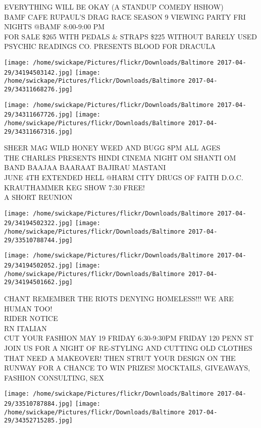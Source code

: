 \documentclass[10pt,letterpaper]{article}
\begin{document}
EVERYTHING WILL BE OKAY (A STANDUP COMEDY HSHOW)\\
BAMF CAFE RUPAUL'S DRAG RACE SEASON 9 VIEWING PARTY FRI NIGHTS @BAMF 8:00{-}9:00 PM\\
FOR SALE \$265 WITH PEDALS \& STRAPS \$225 WITHOUT BARELY USED\\
PSYCHIC READINGS CO. PRESENTS BLOOD FOR DRACULA
\pagebreak

\texttt{[image: /home/swickape/Pictures/flickr/Downloads/Baltimore 2017-04-29/34194503142.jpg]}
\texttt{[image: /home/swickape/Pictures/flickr/Downloads/Baltimore 2017-04-29/34311668276.jpg]}

\texttt{[image: /home/swickape/Pictures/flickr/Downloads/Baltimore 2017-04-29/34311667726.jpg]}
\texttt{[image: /home/swickape/Pictures/flickr/Downloads/Baltimore 2017-04-29/34311667316.jpg]}

SHEER MAG WILD HONEY WEED AND BUGG 8PM ALL AGES\\
THE CHARLES PRESENTS HINDI CINEMA NIGHT OM SHANTI OM BAND BAAJAA BAARAAT BAJIRAU MASTANI\\
JUNE 4TH EXTENDED HELL @HARM CITY DRUGS OF FAITH D.O.C. KRAUTHAMMER KEG SHOW 7:30 FREE!\\
A SHORT REUNION
\pagebreak

\texttt{[image: /home/swickape/Pictures/flickr/Downloads/Baltimore 2017-04-29/34194502322.jpg]}
\texttt{[image: /home/swickape/Pictures/flickr/Downloads/Baltimore 2017-04-29/33510788744.jpg]}

\texttt{[image: /home/swickape/Pictures/flickr/Downloads/Baltimore 2017-04-29/34194502052.jpg]}
\texttt{[image: /home/swickape/Pictures/flickr/Downloads/Baltimore 2017-04-29/34194501662.jpg]}

CHANT REMEMBER THE RIOTS DENYING HOMELESS!!! WE ARE HUMAN TOO!\\
RIDER NOTICE\\
RN ITALIAN\\
CUT YOUR FASHION MAY 19 FRIDAY 6:30{-}9:30PM FRIDAY 120 PENN ST JOIN US FOR A NIGHT OF RE{-}STYLING AND CUTTING OLD CLOTHES THAT NEED A MAKEOVER!  THEN STRUT YOUR DESIGN ON THE RUNWAY FOR A CHANCE TO WIN PRIZES!  MOCKTAILS, GIVEAWAYS, FASHION CONSULTING, SEX
\pagebreak

\texttt{[image: /home/swickape/Pictures/flickr/Downloads/Baltimore 2017-04-29/33510787884.jpg]}
\texttt{[image: /home/swickape/Pictures/flickr/Downloads/Baltimore 2017-04-29/34352715285.jpg]}
\end{document}
